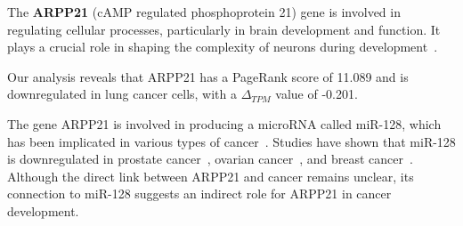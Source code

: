 The \textbf{ARPP21} (cAMP regulated phosphoprotein 21) gene is involved in regulating cellular processes, particularly in brain development and function.
It plays a crucial role in shaping the complexity of neurons during development~\cite{Rehfeld2018ARPP21}.

Our analysis reveals that ARPP21 has a PageRank score of 11.089 and is downregulated in lung cancer cells,
with a $\Delta_{TPM}$ value of -0.201.

The gene ARPP21 is involved in producing a microRNA called miR-128, which has been implicated in various types of cancer~\cite{Li2013ARPP21}.
Studies have shown that miR-128 is downregulated in prostate cancer~\cite{Khan2010ARPP21}, ovarian cancer~\cite{Woo2012ARPP21},
and breast cancer~\cite{Zhu2011ARPP21}.
Although the direct link between ARPP21 and cancer remains unclear,
its connection to miR-128 suggests an indirect role for ARPP21 in cancer development.
\newline